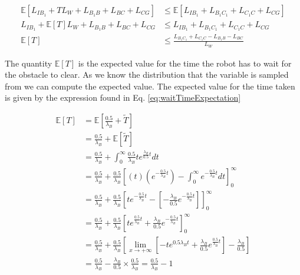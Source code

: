 \documentclass[a4paper,12pt]{article}
\begin{document}
			\begin{equation}
				\begin{split}
					\mathbb{E}\left[L_{IB_{1}} + TL_W + L_{B_{1}B} + L_{BC} + L_{CG}\right] & \leq \mathbb{E}\left[L_{IB_{1}} + L_{B_{1}C_{1}} + L_{C_{1}C} + L_{CG}\right] \\
					L_{IB_{1}} + \mathbb{E}\left[T\right] L_W + L_{B_{1}B} + L_{BC} + L_{CG} & \leq L_{IB_{1}} + L_{B_{1}C_{1}} + L_{C_{1}C} + L_{CG} \\
					\mathbb{E}\left[T\right] & \leq \frac{L_{B_{1}C_{1}} + L_{C_{1}C} - L_{B_{1}B} - L_{BC}}{L_W}
				\end{split}
				\label{eq:costExpectation1}
			\end{equation}

			The quantity $\mathbb{E}\left[T\right]$ is the expected value for the time the robot has to wait for the obstacle to clear. As we know the distribution that the variable is sampled from we can compute the expected value. The expected value for the time taken is given by the expression found in Eq. \ref{eq:waitTimeExpectation}

			\begin{equation}
				\begin{split}
					\mathbb{E}\left[T\right] & = \mathbb{E}\left[\frac{0.5}{\lambda_{B}}+\widetilde{T}\right] \\
					& = \frac{0.5}{\lambda_{B}} + \mathbb{E}\left[\widetilde{T}\right] \\
					& = \frac{0.5}{\lambda_{B}} + \int_{0}^{\infty}\frac{0.5}{\lambda_{B}}te^{\frac{\lambda_{B}}{0.5}t} dt \\
					& = \frac{0.5}{\lambda_{B}} + \frac{0.5}{\lambda_{B}}\left[\left(t\right) \left(e^{-\frac{0.5}{\lambda_{B}}t}\right) - \int_{0}^{\infty}e^{-\frac{0.5}{\lambda_{B}}t} dt \right]_{0}^{\infty}\\
					& = \frac{0.5}{\lambda_{B}} + \frac{0.5}{\lambda_{B}}\left[te^{-\frac{0.5}{\lambda_{B}}t} - \left[-\frac{\lambda_{B}}{0.5}e^{-\frac{0.5}{\lambda_{B}}t}\right]\right]_{0}^{\infty} \\
					& = \frac{0.5}{\lambda_{B}} + \frac{0.5}{\lambda_{B}}\left[te^{\frac{0.5}{\lambda_{B}}t} + \frac{\lambda_{B}}{0.5}e^{-\frac{0.5}{\lambda_{B}}t}\right]_{0}^{\infty} \\
					& = \frac{0.5}{\lambda_{B}} + \frac{0.5}{\lambda_{B}}\left[\lim_{x \to +\infty} \left[-te^{0.5\lambda_{B}t} + \frac{\lambda_{B}}{0.5}e^{\frac{0.5}{\lambda_{B}}t}\right] - \frac{\lambda_{B}}{0.5}\right] \\
					& = \frac{0.5}{\lambda_{B}} - \frac{\lambda_{B}}{0.5}\times \frac{0.5}{\lambda_{B}} = \frac{0.5}{\lambda_{B}}-1
				\end{split}
				\label{eq:waitTimeExpectation}
			\end{equation}
\end{document}
